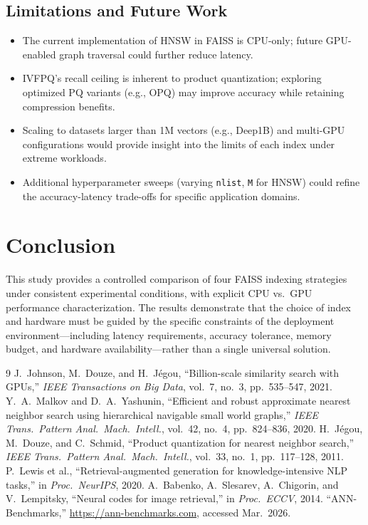 \documentclass[conference]{IEEEtran}
\begin{document}
\subsection{Limitations and Future Work}
\begin{itemize}
    \item The current implementation of HNSW in FAISS is CPU-only; future GPU-enabled graph traversal could further reduce latency.
    \item IVFPQ's recall ceiling is inherent to product quantization; exploring optimized PQ variants (e.g., OPQ) may improve accuracy while retaining compression benefits.
    \item Scaling to datasets larger than 1M vectors (e.g., Deep1B) and multi-GPU configurations would provide insight into the limits of each index under extreme workloads.
    \item Additional hyperparameter sweeps (varying \texttt{nlist}, \texttt{M} for HNSW) could refine the accuracy-latency trade-offs for specific application domains.
\end{itemize}

\section{Conclusion}
This study provides a controlled comparison of four FAISS indexing strategies under consistent experimental conditions, with explicit CPU vs.\ GPU performance characterization. The results demonstrate that the choice of index and hardware must be guided by the specific constraints of the deployment environment---including latency requirements, accuracy tolerance, memory budget, and hardware availability---rather than a single universal solution.

\begin{thebibliography}{9}
J.~Johnson, M.~Douze, and H.~J\'{e}gou, ``Billion-scale similarity search with GPUs,'' \textit{IEEE Transactions on Big Data}, vol.~7, no.~3, pp.~535--547, 2021.
Y.~A.~Malkov and D.~A.~Yashunin, ``Efficient and robust approximate nearest neighbor search using hierarchical navigable small world graphs,'' \textit{IEEE Trans.\ Pattern Anal.\ Mach.\ Intell.}, vol.~42, no.~4, pp.~824--836, 2020.
H.~J\'{e}gou, M.~Douze, and C.~Schmid, ``Product quantization for nearest neighbor search,'' \textit{IEEE Trans.\ Pattern Anal.\ Mach.\ Intell.}, vol.~33, no.~1, pp.~117--128, 2011.
P.~Lewis et al., ``Retrieval-augmented generation for knowledge-intensive NLP tasks,'' in \textit{Proc.\ NeurIPS}, 2020.
A.~Babenko, A.~Slesarev, A.~Chigorin, and V.~Lempitsky, ``Neural codes for image retrieval,'' in \textit{Proc.\ ECCV}, 2014.
``ANN-Benchmarks,'' \url{https://ann-benchmarks.com}, accessed Mar.\ 2026.
\end{thebibliography}
\end{document}
